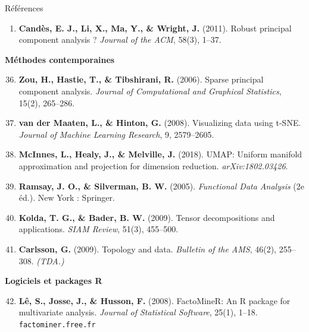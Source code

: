 \begin{frame}[allowframebreaks]{Références}
\begin{enumerate}
  \item \textbf{Candès, E. J., Li, X., Ma, Y., \& Wright, J.} (2011).
        Robust principal component analysis ?
        \textit{Journal of the ACM}, 58(3), 1--37.
\end{enumerate}

\framebreak

\textbf{\large Méthodes contemporaines}\\[6pt]

\begin{enumerate}
  \setcounter{enumi}{35}
  \item \textbf{Zou, H., Hastie, T., \& Tibshirani, R.} (2006).
        Sparse principal component analysis.
        \textit{Journal of Computational and Graphical Statistics}, 15(2), 265--286.

  \item \textbf{van der Maaten, L., \& Hinton, G.} (2008).
        Visualizing data using t-SNE.
        \textit{Journal of Machine Learning Research}, 9, 2579--2605.

  \item \textbf{McInnes, L., Healy, J., \& Melville, J.} (2018).
        UMAP: Uniform manifold approximation and projection for dimension
        reduction. \textit{arXiv:1802.03426}.

  \item \textbf{Ramsay, J. O., \& Silverman, B. W.} (2005).
        \textit{Functional Data Analysis} (2e éd.). New York : Springer.

  \item \textbf{Kolda, T. G., \& Bader, B. W.} (2009).
        Tensor decompositions and applications.
        \textit{SIAM Review}, 51(3), 455--500.

  \item \textbf{Carlsson, G.} (2009).
        Topology and data. \textit{Bulletin of the AMS}, 46(2), 255--308.
        \emph{(TDA.)}
\end{enumerate}

\framebreak

\textbf{\large Logiciels et packages R}\\[6pt]

\begin{enumerate}
  \setcounter{enumi}{41}
  \item \textbf{Lê, S., Josse, J., \& Husson, F.} (2008).
        FactoMineR: An R package for multivariate analysis.
        \textit{Journal of Statistical Software}, 25(1), 1--18.
        \texttt{factominer.free.fr}


\end{enumerate}
\end{frame}
